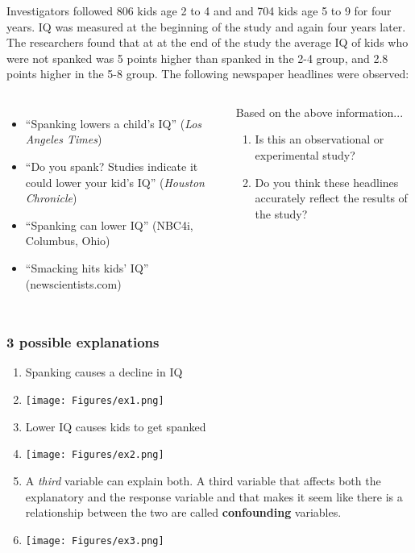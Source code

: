 \begin{frame}
\frametitle{\grp}
\small{Investigators followed 806 kids age 2 to 4 and and 704 kids age 5 to 9 for four years.  IQ was measured at the beginning of the study and again four years later.  The researchers found that at at the end of the study the average IQ of kids who were not spanked was 5 points higher than spanked in the 2-4 group, and 2.8 points higher in the 5-8 group.  The following newspaper headlines were observed:}
\begin{columns}
\begin{itemize}
    \item
    ``Spanking lowers a child's IQ'' (\emph{Los Angeles Times})
    \item
    ``Do you spank? Studies indicate it could lower your kid's IQ'' (\emph{Houston Chronicle})
    \item
    ``Spanking can lower IQ'' (NBC4i, Columbus, Ohio)
    \item
    ``Smacking hits kids' IQ'' (newscientists.com)
\end{itemize}
\begin{clicker}{Based on the above information...}
\begin{enumerate}
    \item
    Is this an observational or experimental study?
    \item
    Do you think these headlines accurately reflect the results of the study?
\end{enumerate}
\end{clicker}
\end{columns}
\end{frame}

\begin{frame}
\frametitle{3 possible explanations}
\begin{enumerate}
    \item
    Spanking causes a decline in IQ
    \item[]
    \texttt{[image: Figures/ex1.png]}
    \item
    Lower IQ causes kids to get spanked
    \item[]
    \texttt{[image: Figures/ex2.png]}
    \item
    A \emph{third} variable can explain both.  A third variable that affects both the explanatory and the response variable and that makes it seem like there is a relationship between the two are called \textbf{confounding} variables.
    \item[]
    \texttt{[image: Figures/ex3.png]}
\end{enumerate}
\end{frame}

